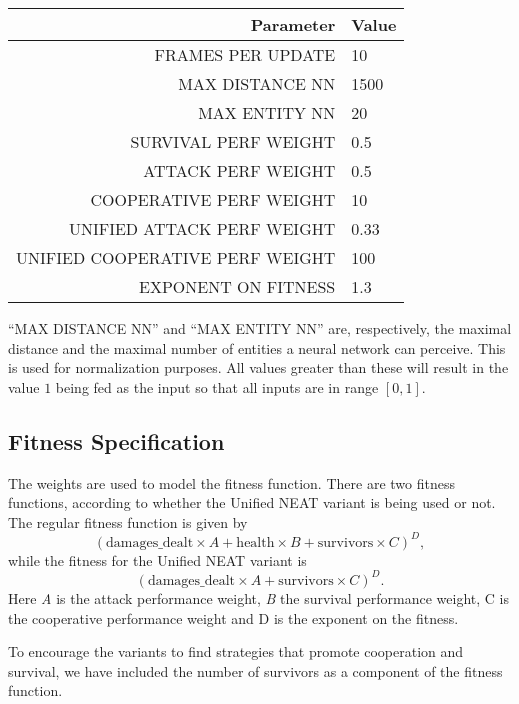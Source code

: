\begin{tabular}{rl}
    \toprule
    Parameter & Value \\
    \midrule
    FRAMES PER UPDATE & 10 \\
    MAX DISTANCE NN & 1500 \\
    MAX ENTITY NN  & 20 \\[1ex]

    SURVIVAL PERF WEIGHT & 0.5 \\
    ATTACK PERF WEIGHT & 0.5 \\
    COOPERATIVE PERF WEIGHT & 10 \\
    UNIFIED ATTACK PERF WEIGHT & 0.33 \\
    UNIFIED COOPERATIVE PERF WEIGHT & 100 \\
    EXPONENT ON FITNESS & 1.3 \\
    \bottomrule
\end{tabular}

``MAX DISTANCE NN'' and ``MAX ENTITY NN'' are, respectively, the
maximal distance and the maximal number of entities a neural network
can perceive.  This is used for normalization purposes. All values
greater than these will result in the value \(1\) being fed as the
input so that all inputs are in range \([0, 1]\).

\subsection{Fitness Specification}

The weights are used to model the fitness function. There are two
fitness functions, according to whether the Unified NEAT variant is
being used or not.  The regular fitness function is given by
\begin{equation*}
  (\text{damages\_dealt} \times A + \text{health} \times B + \text{survivors} \times C)^D,
\end{equation*}
while the fitness for the Unified NEAT variant is
\begin{equation*}
  (\text{damages\_dealt} \times A + \text{survivors} \times C)^D.
\end{equation*}
Here \emph{A} is the attack performance weight, \emph{B} the survival
performance weight, C is the cooperative performance weight and D is
the exponent on the fitness.

To encourage the variants to find strategies that promote cooperation
and survival, we have included the number of survivors as a component
of the fitness function.
